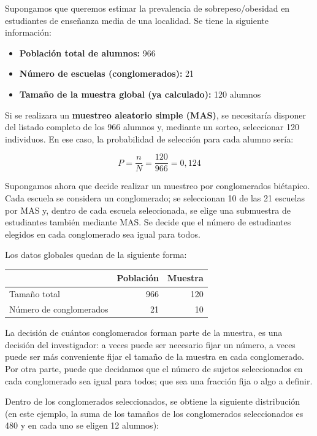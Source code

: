 \documentclass[
  spanish,
  a4paper,
]{scrbook}
\begin{document}
Supongamos que queremos estimar la prevalencia de sobrepeso/obesidad en
estudiantes de enseñanza media de una localidad. Se tiene la siguiente
información:

\begin{itemize}
\item
  \textbf{Población total de alumnos:} 966
\item
  \textbf{Número de escuelas (conglomerados):} 21
\item
  \textbf{Tamaño de la muestra global (ya calculado):} 120 alumnos
\end{itemize}

Si se realizara un \textbf{muestreo aleatorio simple (MAS)}, se
necesitaría disponer del listado completo de los 966 alumnos y, mediante
un sorteo, seleccionar 120 individuos. En ese caso, la probabilidad de
selección para cada alumno sería:

\[
P = \frac{n}{N} = \frac{120}{966}=0,124
\]

Supongamos ahora que decide realizar un muestreo por conglomerados
biétapico. Cada escuela se considera un conglomerado; se seleccionan 10
de las 21 escuelas por MAS y, dentro de cada escuela seleccionada, se
elige una submuestra de estudiantes también mediante MAS. Se decide que
el número de estudiantes elegidos en cada conglomerado sea igual para
todos.

Los datos globales quedan de la siguiente forma:

\begin{table}
\fontsize{12.0pt}{14.0pt}\selectfont
\begin{tabular*}{\linewidth}{@{\extracolsep{\fill}}lrr}
\toprule
  & Población & Muestra \\ 
\midrule\addlinespace[2.5pt]
Tamaño total & 966 & 120 \\ 
Número de conglomerados & 21 & 10 \\ 
\bottomrule
\end{tabular*}
\end{table}

La decisión de cuántos conglomerados forman parte de la muestra, es una
decisión del investigador: a veces puede ser necesario fijar un número,
a veces puede ser más conveniente fijar el tamaño de la muestra en cada
conglomerado. Por otra parte, puede que decidamos que el número de
sujetos seleccionados en cada conglomerado sea igual para todos; que sea
una fracción fija o algo a definir.

Dentro de los conglomerados seleccionados, se obtiene la siguiente
distribución (en este ejemplo, la suma de los tamaños de los
conglomerados seleccionados es 480 y en cada uno se eligen 12 alumnos):
\end{document}
